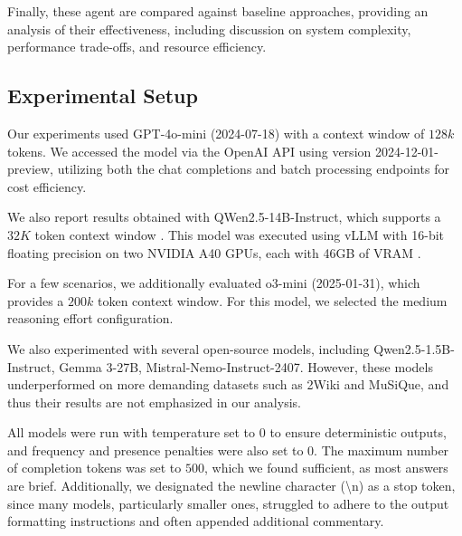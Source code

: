 \noindent Finally, these agent are compared against baseline approaches, providing an analysis of their effectiveness, including discussion on system complexity, performance trade-offs, and resource efficiency.


\subsection{Experimental Setup}

Our experiments used GPT-4o-mini (2024-07-18) with a context window of $128k$ tokens. We accessed the model via the OpenAI API using version 2024-12-01-preview, utilizing both the chat completions and batch processing endpoints for cost efficiency.

\noindent We also report results obtained with QWen2.5-14B-Instruct, which supports a $32K$ token context window \cite{qwen2}. This model was executed using vLLM with 16-bit floating precision on two NVIDIA A40 GPUs, each with 46GB of VRAM \cite{kwon2023efficient}.

\noindent For a few scenarios, we additionally evaluated o3-mini (2025-01-31), which provides a $200k$ token context window. For this model, we selected the medium reasoning effort configuration.

\noindent We also experimented with several open-source models, including Qwen2.5-1.5B-Instruct, Gemma 3-27B, Mistral-Nemo-Instruct-2407. However, these models underperformed on more demanding datasets such as 2Wiki and MuSiQue, and thus their results are not emphasized in our analysis.

\noindent All models were run with temperature set to $0$ to ensure deterministic outputs, and frequency and presence penalties were also set to $0$. The maximum number of completion tokens was set to $500$, which we found sufficient, as most answers are brief. Additionally, we designated the newline character (\textbackslash n) as a stop token, since many models, particularly smaller ones, struggled to adhere to the output formatting instructions and often appended additional commentary.